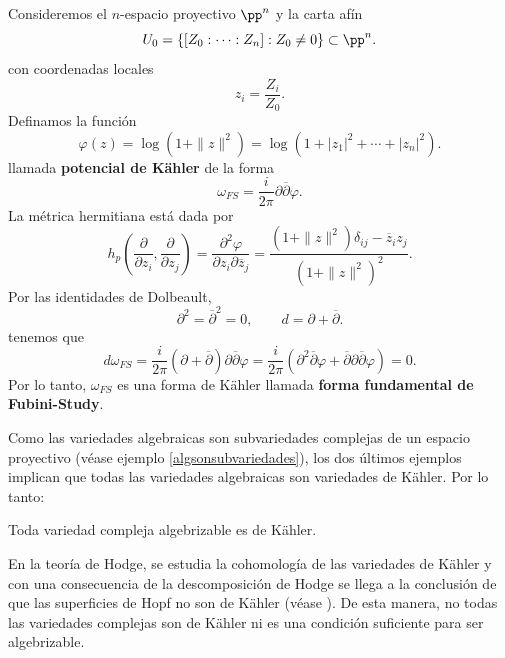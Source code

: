 \begin{example}
	Consideremos el $n$-espacio proyectivo $\pp^n$ y la carta afín
	\begin{equation*}
		U_0=\{[Z_0:\cdots:Z_n]:Z_0\neq 0\}\subset\pp^n.
	\end{equation*}
	con coordenadas locales
	\begin{equation*}
		z_i=\frac{Z_i}{Z_0}.
	\end{equation*} 
	Definamos la función
	\begin{equation*}
		\varphi(z)=\log(1+\|z\|^2)=\log(1+|z_1|^2+\cdots+|z_n|^2).
	\end{equation*}
	llamada \textbf{potencial de Kähler} de la forma 
	\begin{equation*}
		\omega_{FS}=\frac{i}{2\pi}\partial \overline{\partial}\varphi.
	\end{equation*}
	La métrica hermitiana está dada por
	\begin{equation*}
		h_p\left(\frac{\partial}{\partial z_i},\frac{\partial}{\partial z_j}\right)=\frac{\partial^2 \varphi}{\partial z_i\partial \overline{z}_j}=\frac{(1+\|z\|^2)\delta_{ij}-\overline{z}_i z_j}{(1+\|z\|^2)^2}.
	\end{equation*}
	Por las identidades de Dolbeault,
	\begin{equation*}
		\partial^2=\overline{\partial}^2=0,\qquad d=\partial+\overline{\partial}.
	\end{equation*}
	tenemos que
	\begin{equation*}
		d\omega_{FS}=\frac{i}{2\pi}(\partial+\overline{\partial})\partial \overline{\partial}\varphi=\frac{i}{2\pi}(\partial^2\overline{\partial}\varphi+\overline{\partial}\partial\overline{\partial}\varphi)=0.
	\end{equation*}
	Por lo tanto, $\omega_{FS}$ es una forma de Kähler llamada \textbf{forma fundamental de Fubini-Study}.
\end{example}

Como las variedades algebraicas son subvariedades complejas de un espacio proyectivo (véase ejemplo \ref{algsonsubvariedades}), los dos últimos ejemplos implican que todas las variedades algebraicas son variedades de Kähler. Por lo tanto:

\begin{corollary}
	Toda variedad compleja algebrizable es de Kähler.
\end{corollary}

En la teoría de Hodge, se estudia la cohomología de las variedades de Kähler y con una consecuencia de la descomposición de Hodge se llega a la conclusión de que las superficies de Hopf no son de Kähler (véase  \parencite[Corollary 6.13]{2002hodge}). De esta manera, no todas las variedades complejas son de Kähler ni es una condición suficiente para ser algebrizable. 

